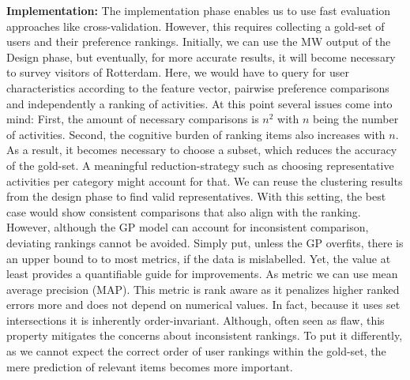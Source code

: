 \documentclass[11pt,a4paper,oneside]{article}
\begin{document}
\textbf{Implementation:} 
The implementation phase enables us to use fast evaluation approaches like cross-validation. However, this requires collecting a gold-set of users and their preference rankings. Initially, we can use the MW output of the Design phase, but eventually, for more accurate results, it will become necessary to survey visitors of Rotterdam. Here, we would have to query for user characteristics according to the feature vector, pairwise preference comparisons and independently a ranking of activities. At this point several issues come into mind: First, the amount of necessary comparisons is $n^2$ with $n$ being the number of activities. Second, the cognitive burden of ranking items also increases with $n$. As a result, it becomes necessary to choose a subset, which reduces the accuracy of the gold-set. A meaningful reduction-strategy such as choosing representative activities per category might account for that. We can reuse the clustering results from the design phase to find valid representatives. With this setting, the best case would show consistent comparisons that also align with the ranking. However, although the GP model can account for inconsistent comparison, deviating rankings cannot be avoided. Simply put, unless the GP overfits, there is an upper bound to to most metrics, if the data is mislabelled. Yet, the value at least provides a quantifiable guide for improvements. As metric we can use mean average precision (MAP). This metric is rank aware as it penalizes higher ranked errors more and does not depend on numerical values. In fact, because it uses set intersections it is inherently order-invariant. Although, often seen as flaw, this property mitigates the concerns about inconsistent rankings. To put it differently, as we cannot expect the correct order of user rankings within the gold-set, the mere prediction of relevant items becomes more important.  

\clearpage 
\printbibliography
\end{document}
